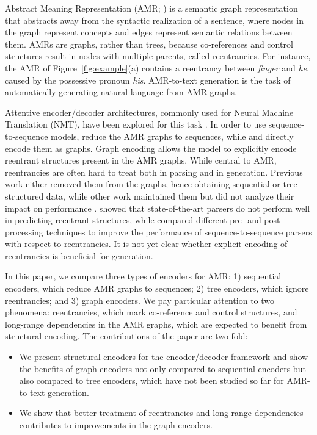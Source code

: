 \documentclass[11pt,a4paper]{article}
\begin{document}
Abstract Meaning Representation (AMR; \citealt{Banarescu13abstractmeaning}) is a semantic graph representation that abstracts away from the syntactic realization of a sentence, where nodes in the graph represent concepts and edges represent semantic relations between them. AMRs are graphs, rather than trees, because co-references and control structures result in nodes with multiple parents, called reentrancies. For instance, the AMR of Figure~\ref{fig:example}(a) contains a reentrancy between \emph{finger} and \emph{he}, caused by the possessive pronoun \emph{his}. AMR-to-text generation is the task of automatically generating natural language from AMR graphs.

Attentive encoder/decoder architectures, commonly used for Neural Machine Translation (NMT), have been explored for this task \cite{konstas2017neural,song,beck}. 
In order to use sequence-to-sequence models,  reduce the AMR graphs to sequences, while  and  directly encode them as graphs. Graph encoding allows the model to explicitly encode reentrant structures present in the AMR graphs.
While central to AMR, reentrancies are often hard to treat both in parsing and in generation. Previous work either removed them from the graphs, hence obtaining sequential \cite{konstas2017neural} or tree-structured \cite{liu2018toward,takase2016neural} data, while other work maintained them but did not analyze their impact on performance \cite[e.g.,][]{song,beck}.  showed that state-of-the-art parsers do not perform well in predicting reentrant structures, while  compared different pre- and post-processing techniques to improve the performance of sequence-to-sequence parsers with respect to reentrancies. It is not yet clear whether explicit encoding of reentrancies is beneficial for generation.









In this paper, we compare three types of encoders for AMR: 1) sequential encoders, which reduce AMR graphs to sequences; 2) tree encoders, which ignore reentrancies; and 3) graph encoders. 
We pay particular attention to two phenomena: reentrancies, which mark co-reference and control structures, and long-range dependencies in the AMR graphs, which are expected to benefit from structural encoding. The contributions of the paper are two-fold:
\begin{itemize}
  \item We present structural encoders for the encoder/decoder framework and show the benefits of graph encoders not only compared to sequential encoders but also compared to tree encoders, which have not been studied so far for AMR-to-text generation.
  \item We show that better treatment of reentrancies and long-range dependencies contributes to improvements in the graph encoders.
\end{itemize}
\end{document}
